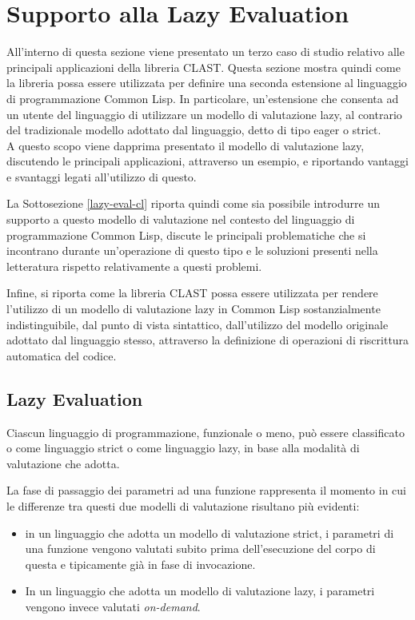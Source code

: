 \section{Supporto alla Lazy Evaluation}
\label{lazy-evaluation}

All'interno di questa sezione viene presentato un terzo caso di studio relativo
alle principali applicazioni della libreria CLAST. Questa sezione mostra quindi
come la libreria possa essere utilizzata per definire una seconda estensione al
linguaggio di programmazione Common Lisp. In particolare, un'estensione che
consenta ad un utente del linguaggio di utilizzare un modello di valutazione
lazy, al contrario del tradizionale modello adottato dal linguaggio, detto di
tipo eager o strict.\\

A questo scopo viene dapprima presentato il modello di valutazione lazy,
discutendo le principali applicazioni, attraverso un esempio, e riportando
vantaggi e svantaggi legati all'utilizzo di questo.

La Sottosezione \ref{lazy-eval-cl} riporta quindi come sia possibile introdurre
un supporto a questo modello di valutazione nel contesto del linguaggio di
programmazione Common Lisp, discute le principali problematiche che si
incontrano durante un'operazione di questo tipo e le soluzioni presenti nella
letteratura rispetto relativamente a questi problemi.

Infine, si riporta come la libreria CLAST possa essere utilizzata per rendere
l'utilizzo di un modello di valutazione lazy in Common Lisp sostanzialmente
indistinguibile, dal punto di vista sintattico, dall'utilizzo del modello
originale adottato dal linguaggio stesso, attraverso la definizione di
operazioni di riscrittura automatica del codice.

\subsection{Lazy Evaluation}

Ciascun linguaggio di programmazione, funzionale o meno, può essere classificato
o come linguaggio strict o come linguaggio lazy, in base alla modalità di
valutazione che adotta.

La fase di passaggio dei parametri ad una funzione rappresenta il momento in cui
le differenze tra questi due modelli di valutazione risultano più evidenti:

\begin{itemize}

\item in un linguaggio che adotta un modello di valutazione strict, i parametri
di una funzione vengono valutati subito prima dell'esecuzione del corpo di
questa e tipicamente già in fase di invocazione.

\item In un linguaggio che adotta un modello di valutazione lazy, i parametri
vengono invece valutati \textit{on-demand}.

\end{itemize}


